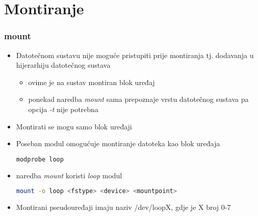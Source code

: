 \documentclass[croatian,t]{beamer} %
\begin{document}
	\section{Montiranje}
	\begin{frame}[fragile]
	\frametitle{mount}
		\begin{itemize}
			\item Datotečnom sustavu nije moguće pristupiti prije montiranja tj. dodavanja u hijerarhiju datotečnog sustava
			\begin{itemize}
			\begin{lstlisting}[basicstyle={\footnotesize\ttfamily},language=bash]
			mount -t <fstype> <device> <mountpoint>
			\end{lstlisting}
				\item ovime je na sustav montiran blok uređaj
				\item ponekad naredba \textit{mount} sama prepoznaje vrstu datotečnog sustava pa opcija \textit{-t} nije potrebna
			\end{itemize}
			\item Montirati se mogu samo blok uređaji
			\item Poseban modul omogućuje montiranje datoteka kao blok uređaja
			\begin{lstlisting}[basicstyle={\footnotesize\ttfamily},language=bash]
			modprobe loop
			\end{lstlisting}
			\item naredba \textit{mount} koristi \textit{loop} modul
			\begin{lstlisting}[basicstyle={\footnotesize\ttfamily},language=bash]
			mount -o loop <fstype> <device> <mountpoint>
			\end{lstlisting}
			\item Montirani pseudouređaji imaju naziv /dev/loopX, gdje je X broj 0-7
		\end{itemize}
	\end{frame}	
	
\end{document}
